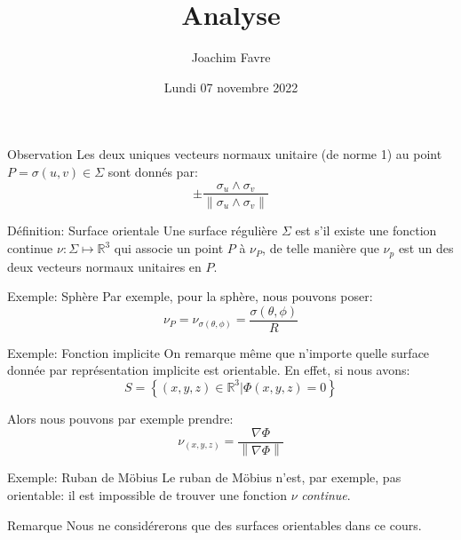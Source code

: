 \documentclass[a4paper]{article}
\title{Analyse}
\author{Joachim Favre}
\date{Lundi 07 novembre 2022}
\begin{document}
\maketitle



\begin{parag}{Observation}
    Les deux uniques vecteurs normaux unitaire (de norme 1) au point $P = \sigma\left(u, v\right) \in \Sigma$ sont donnés par: 
    \[\pm \frac{\sigma_u \wedge \sigma_v}{\left\|\sigma_u \wedge \sigma_v\right\|}\]
\end{parag}

\begin{parag}{Définition: Surface orientale}
    Une surface régulière $\Sigma$ est  s'il existe une fonction continue $\nu : \Sigma \mapsto \mathbb{R}^3$ qui associe un point $P$ à $\nu_P$, de telle manière que $\nu_p$ est un des deux vecteurs normaux unitaires en $P$.

    \begin{subparag}{Exemple: Sphère}
        Par exemple, pour la sphère, nous pouvons poser: 
        \[\nu_P = \nu_{\sigma\left(\theta, \phi\right)} = \frac{\sigma\left(\theta, \phi\right)}{R}\]
    \end{subparag}

    \begin{subparag}{Exemple: Fonction implicite}
        On remarque même que n'importe quelle surface donnée par représentation implicite est orientable. En effet, si nous avons: 
        \[S = \left\{\left(x, y, z\right) \in \mathbb{R}^3 | \Phi\left(x, y, z\right) = 0\right\}\]
         
        Alors nous pouvons par exemple prendre: 
        \[\nu_{\left(x, y, z\right)} = \frac{\nabla\Phi}{\left\|\nabla\Phi\right\|}\]
    \end{subparag}

    \begin{subparag}{Exemple: Ruban de Möbius}
        Le ruban de Möbius n'est, par exemple, pas orientable: il est impossible de trouver une fonction $\nu$ \textit{continue}.

    \end{subparag}

    \begin{subparag}{Remarque}
        Nous ne considérerons que des surfaces orientables dans ce cours.
    \end{subparag}
\end{parag}
\end{document}
